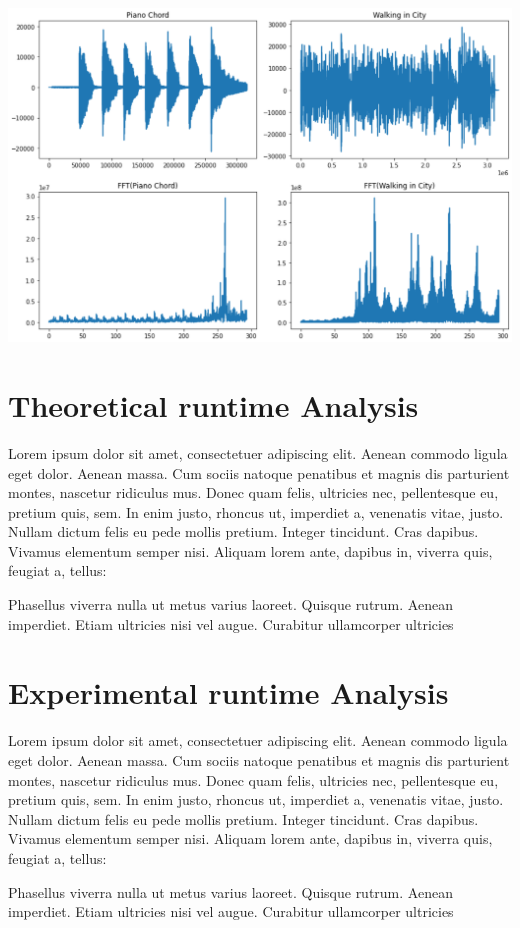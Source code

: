 \documentclass[paper=a4, fontsize=11pt]{scrartcl}
\numberwithin{equation}{section}		%
\numberwithin{figure}{section}			%
\numberwithin{table}{section}				%
\begin{document}
\includegraphics[scale=0.65]{images/fftaudio.png}

\section{Theoretical runtime Analysis}
Lorem ipsum dolor sit amet, consectetuer adipiscing elit. Aenean commodo ligula eget dolor. Aenean massa. Cum sociis natoque penatibus et magnis dis parturient montes, nascetur ridiculus mus. Donec quam felis, ultricies nec, pellentesque eu, pretium quis, sem. In enim justo, rhoncus ut, imperdiet a, venenatis vitae, justo. Nullam dictum felis eu pede mollis pretium. Integer tincidunt. Cras dapibus. Vivamus elementum semper nisi. Aliquam lorem ante, dapibus in, viverra quis, feugiat a, tellus:

Phasellus viverra nulla ut metus varius laoreet. Quisque rutrum. Aenean imperdiet. Etiam ultricies nisi vel augue. Curabitur ullamcorper ultricies 


\section{Experimental runtime Analysis}
Lorem ipsum dolor sit amet, consectetuer adipiscing elit. Aenean commodo ligula eget dolor. Aenean massa. Cum sociis natoque penatibus et magnis dis parturient montes, nascetur ridiculus mus. Donec quam felis, ultricies nec, pellentesque eu, pretium quis, sem. In enim justo, rhoncus ut, imperdiet a, venenatis vitae, justo. Nullam dictum felis eu pede mollis pretium. Integer tincidunt. Cras dapibus. Vivamus elementum semper nisi. Aliquam lorem ante, dapibus in, viverra quis, feugiat a, tellus:

Phasellus viverra nulla ut metus varius laoreet. Quisque rutrum. Aenean imperdiet. Etiam ultricies nisi vel augue. Curabitur ullamcorper ultricies 
\end{document}
